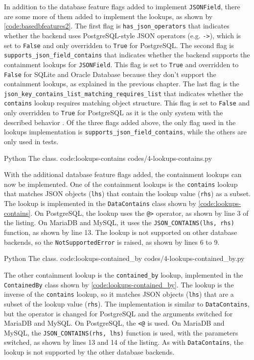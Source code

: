 In addition to the database feature flags added to implement \verb|JSONField|,
there are some more of them added to implement the lookups, as shown by
\autoref{code:basedbfeatures2}. The first flag is \verb|has_json_operators|
that indicates whether the backend uses PostgreSQL-style JSON operators (e.g.
\verb|->|), which is set to \verb|False| and only overridden to \verb|True| for
PostgreSQL. The second flag is \verb|supports_json_field_contains| that
indicates whether the backend supports the containment lookups for
\verb|JSONField|. This flag is set to \verb|True| and overridden to
\verb|False| for SQLite and Oracle Database because they don't support the
containment lookups, as explained in the previous chapter. The last flag is the
\verb|json_key_contains_list_matching_requires_list| that indicates whether the
\verb|contains| lookup requires matching object structure. This flag is set
to \verb|False| and only overridden to \verb|True| for PostgreSQL as it is the
only system with the described behavior \cite{postgres:json}. Of the three
flags added above, the only flag used in the lookups implementation is
\verb|supports_json_field_contains|, while the others are only used in tests.

\listing
{Python}
{The  class.}
{code:lookups-contains}
{codes/4-lookups-contains.py}

With the additional database feature flags added, the containment lookups can
now be implemented. One of the containment lookups is the \verb|contains|
lookup that matches JSON objects (\verb|lhs|) that contain the lookup value
(\verb|rhs|) as a subset. The lookup is implemented in the \verb|DataContains|
class shown by \autoref{code:lookups-contains}. On PostgreSQL, the lookup uses
the \verb|@>| operator, as shown by line 3 of the listing. On MariaDB and
MySQL, it uses the \verb|JSON_CONTAINS(lhs, rhs)| function, as shown by line
13. The lookup is not supported on other database backends, so the
\verb|NotSupportedError| is raised, as shown by lines 6 to 9.

\listing
{Python}
{The  class.}
{code:lookups-contained_by}
{codes/4-lookups-contained_by.py}

The other containment lookup is the \verb|contained_by| lookup, implemented in
the \verb|ContainedBy| class shown by \autoref{code:lookups-contained_by}. The
lookup is the inverse of the \verb|contains| lookup, so it matches JSON objects
(\verb|lhs|) that are a subset of the lookup value (\verb|rhs|). The
implementation is similar to \verb|DataContains|, but the operator is changed
for PostgreSQL and the arguments switched for MariaDB and MySQL. On PostgreSQL,
the \verb|<@| is used. On MariaDB and MySQL, the \verb|JSON_CONTAINS(rhs, lhs)|
function is used, with the parameters switched, as shown by lines 13 and 14 of
the listing. As with \verb|DataContains|, the lookup is not supported by the
other database backends.
